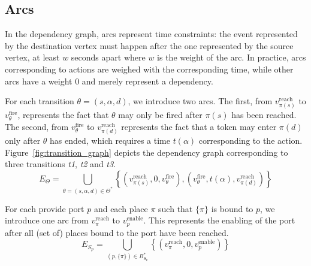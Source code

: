 \subsection{Arcs}

In the dependency graph, arcs represent time constraints: the event represented
by the destination vertex must happen after the one represented by the source
vertex, at least $w$ seconds apart where $w$ is the weight of the arc. In
practice, arcs corresponding to actions are weighed with the corresponding
time, while other arcs have a weight 0 and merely represent a dependency.


%

For each transition $\theta = (s, \alpha, d)$, we introduce
two arcs.
%
The first, from $v_{\pi(s)}^\text{reach}$
to $v_\theta^\text{fire}$, represents the fact that $\theta$ may only
be fired after $\pi(s)$ has been reached.
%
The second, from $v_\theta^\text{fire}$ to $v_{\pi(d)}^\text{reach}$
represents the fact that a token may enter $\pi(d)$ only after
$\theta$ has ended, which requires a time $t(\alpha)$ corresponding
to the action.
%
Figure~\ref{fig:transition_graph} depicts the dependency graph corresponding to three
transitions \emph{t1}, \emph{t2} and \emph{t3}.
\[
  E_\Theta = \bigcup_{\theta=(s,\alpha,d)\in\Theta^*} \left\{ \left(v_{\pi(s)}^\text{reach},0,v_\theta^\text{fire}\right), \left(v_\theta^\text{fire},t(\alpha),v_{\pi(d)}^\text{reach}\right)\right\} 
\]




For each provide port $p$ and each place $\pi$ such that
$\{\pi\}$ is bound to $p$, we introduce one arc from
$v_\pi^\text{reach}$ to $v_p^\text{enable}$. This represents the
enabling of the port after all (set of) places bound to the port
have been reached.
\[
E_{S_p}= \bigcup_{(p,\{\pi\})\in B_{S_p}^*}\left\{ \left(v_\pi^\text{reach},0,v_p^\text{enable}\right)\right\}
\]

